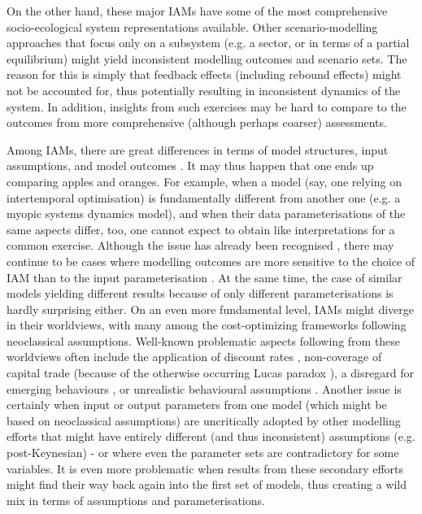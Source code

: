 \documentclass{article}
\begin{document}
\begin{refsection}
On the other hand, these major IAMs have some of the most comprehensive socio-ecological system representations available. Other scenario-modelling approaches that focus only on a subsystem (e.g. a sector, or in terms of a partial equilibrium) might yield inconsistent modelling outcomes and scenario sets. The reason for this is simply that feedback effects (including rebound effects) might not be accounted for, thus potentially resulting in inconsistent dynamics of the system. In addition, insights from such exercises may be hard to compare to the outcomes from more comprehensive (although perhaps coarser) assessments.

    Among IAMs, there are great differences in terms of model structures, input assumptions, and model outcomes \parencite{krey_2014,krey_2019,hiroto_2020,keppo_2021}. It may thus happen that one ends up comparing apples and oranges. For example, when a model (say, one relying on intertemporal optimisation) is fundamentally different from another one (e.g. a myopic systems dynamics model), and when their data parameterisations of the same aspects differ, too, one cannot expect to obtain like interpretations for a common exercise.\footnotemark{} Although the issue has already been recognised \parencite{giarola_2021}, there may continue to be cases where modelling outcomes are more sensitive to the choice of IAM than to the input parameterisation \parencite{sognnaes_2021}. At the same time, the case of similar models yielding different results because of only different parameterisations is hardly surprising either. On an even more fundamental level, IAMs might diverge in their worldviews, with many among the cost-optimizing frameworks following neoclassical assumptions. Well-known problematic aspects following from these worldviews often include the application of discount rates \parencite{emmerling_2019}, non-coverage  of capital trade (because of the otherwise occurring Lucas paradox \parencite{lucas_1990,keppo_2021}), a disregard for emerging behaviours \parencite{farmer_2015}, or unrealistic behavioural assumptions \parencite{asefi_2021}. Another issue is certainly when input or output parameters from one model (which might be based on neoclassical assumptions) are uncritically adopted by other modelling efforts that might have entirely different (and thus inconsistent) assumptions (e.g. post-Keynesian) - or where even the parameter sets are contradictory for some variables. It is even more problematic when results from these secondary efforts might find their way back again into the first set of models, thus creating a wild mix in terms of assumptions and parameterisations.\footnotemark{}


\end{refsection}
\end{document}
